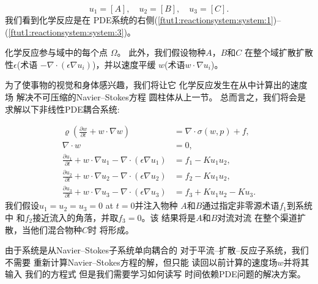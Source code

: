 \[
  u_1 = [A], \quad u_2 = [B], \quad u_3 = [C].
\]
我们看到化学反应是在
PDE系统的右侧(\ref{ftut1:reactionsystem:system:1})--(\ref{ftut1:reactionsystem:system:3})。

化学反应参与域中的每个点
$\Omega$。 此外，我们假设物种$A$，$B$和$C$
在整个域扩散扩散性$\epsilon$(术语
$-\nabla\cdot(\epsilon\nabla u_i)$)，并以速度平缓
$w$(术语$w\cdot\nabla u_i$)。

为了使事物的视觉和身体感兴趣，我们将让它
化学反应发生在从中计算出的速度场
解决不可压缩的Navier--Stokes方程
圆柱体从上一节。 总而言之，我们将会是
求解以下非线性PDE耦合系统:

\begin{align}
  \label{ftut1:reactionsystem:full}
  \varrho\left(\frac{\partial w}{\partial t} +
  w \cdot \nabla w\right) &= \nabla\cdot\sigma(w, p) + f, \\
  \nabla \cdot w &= 0, \\
  \frac{\partial u_1}{\partial t} +
  w \cdot \nabla u_1 - \nabla\cdot(\epsilon\nabla u_1)
    &= f_1 - K u_1 u_2, \\
  \frac{\partial u_2}{\partial t} +
  w \cdot \nabla u_2 - \nabla\cdot(\epsilon\nabla u_2)
    &= f_2 - K u_1 u_2, \\
  \frac{\partial u_3}{\partial t} +
  w \cdot \nabla u_3 - \nabla\cdot(\epsilon\nabla u_3)
    &= f_3 + K u_1 u_2 - K u_3.
\end{align}
我们假设$u_1 = u_2 = u_3 = 0$ at $t = 0$并注入物种
$A$和$B$通过指定非零源术语$f_1$到系统中
和$f_2$接近流入的角落，并取$f_3 = 0$。该
结果将是$A$和$B$对流对流
在整个渠道扩散，当他们混合物种$C$时
将形成。

由于系统是从Navier--Stokes子系统单向耦合的
对于平流--扩散--反应子系统，我们不需要
重新计算Navier--Stokes方程的解，但只能
读回以前计算的速度场$w$并将其输入
我们的方程式 但是我们需要学习如何读写
时间依赖PDE问题的解决方案。
